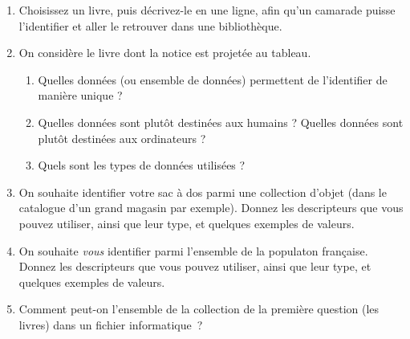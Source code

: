 \documentclass[12pt]{article}
\begin{document}

\begin{enumerate}
  \item Choisissez un livre, puis décrivez-le en une ligne, afin qu'un camarade puisse l'identifier et aller le retrouver dans une bibliothèque.
    \item On considère le livre dont la notice est projetée au tableau.
    \begin{enumerate}
    \item Quelles données (ou ensemble de données) permettent de l'identifier de manière unique ?
    \item Quelles données sont plutôt destinées aux humains ? Quelles données sont plutôt destinées aux ordinateurs ?
    \item Quels sont les types de données utilisées ?
    \end{enumerate}
  \item On souhaite identifier votre sac à dos parmi une collection d'objet (dans le catalogue d'un grand magasin par exemple).
  Donnez les descripteurs que vous pouvez utiliser, ainsi que leur type, et quelques exemples de valeurs.
  \item On souhaite \emph{vous} identifier parmi l'ensemble de la populaton française.
  Donnez les descripteurs que vous pouvez utiliser, ainsi que leur type, et quelques exemples de valeurs.
  \item Comment peut-on l'ensemble de la collection de la première question (les livres) dans un fichier informatique ?
\end{enumerate}
\end{document}
